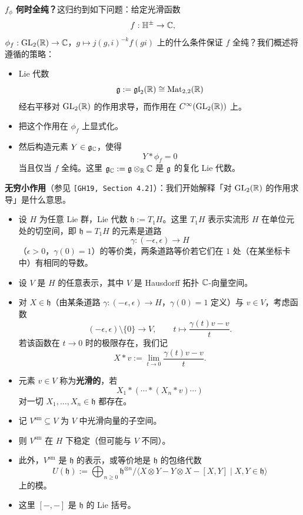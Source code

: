 \textbf{$f_\phi$ 何时全纯？}这归约到如下问题：给定光滑函数
\[
f:\mathbb{H}^\pm\to\mathbb{C},
\]
$\phi_f:\operatorname{GL}_2(\mathbb{R})\to\mathbb{C}$，$g\mapsto j(g,i)^{-k}f(gi)$ 上的什么条件保证 $f$ 全纯？我们概述将遵循的策略：
\begin{itemize}
\item Lie 代数
\[
\mathfrak{g}:=\mathfrak{gl}_2(\mathbb{R})\cong\mathrm{Mat}_{2,2}(\mathbb{R})
\]
经右平移对 $\operatorname{GL}_2(\mathbb{R})$ 的作用求导，而作用在 $C^\infty(\operatorname{GL}_2(\mathbb{R}))$ 上。
\item 把这个作用在 $\phi_f$ 上显式化。
\item 然后构造元素 $Y\in\mathfrak{g}_{\mathbb{C}}$，使得
\[
Y*\phi_f=0
\]
当且仅当 $f$ 全纯。这里 $\mathfrak{g}_{\mathbb{C}}:=\mathfrak{g}\otimes_{\mathbb{R}}\mathbb{C}$ 是 $\mathfrak{g}$ 的复化 Lie 代数。
\end{itemize}

\textbf{无穷小作用}（参见 \texttt{[GH19, Section 4.2]}）：我们开始解释「对 $\operatorname{GL}_2(\mathbb{R})$ 的作用求导」是什么意思。
\begin{itemize}
\item 设 $H$ 为任意 Lie 群，Lie 代数 $\mathfrak{h}:=T_1H$。这里 $T_1H$ 表示实流形 $H$ 在单位元处的切空间，即 $\mathfrak{h}=T_1H$ 的元素是道路
\[
\gamma:(-\epsilon,\epsilon)\to H
\]
（$\epsilon>0$，$\gamma(0)=1$）的等价类，两条道路等价若它们在 $1$ 处（在某坐标卡中）有相同的导数。
\item 设 $V$ 是 $H$ 的任意表示，其中 $V$ 是 Hausdorff 拓扑 $\mathbb{C}$-向量空间。
\item 对 $X\in\mathfrak{h}$（由某条道路 $\gamma:(-\epsilon,\epsilon)\to H$，$\gamma(0)=1$ 定义）与 $v\in V$，考虑函数
\[
(-\epsilon,\epsilon)\setminus\{0\}\to V,\qquad t\mapsto\frac{\gamma(t)v-v}{t}.
\]
若该函数在 $t\to0$ 时的极限存在，我们记
\[
X*v:=\lim_{t\to0}\frac{\gamma(t)v-v}{t}.
\]
\item 元素 $v\in V$ 称为\textbf{光滑的}，若
\[
X_1*(\cdots*(X_n*v)\cdots)
\]
对一切 $X_1,\dots,X_n\in\mathfrak{h}$ 都存在。
\item 记 $V^{\mathrm{sm}}\subseteq V$ 为 $V$ 中光滑向量的子空间。
\item 则 $V^{\mathrm{sm}}$ 在 $H$ 下稳定（但可能与 $V$ 不同）。
\item 此外，$V^{\mathrm{sm}}$ 是 $\mathfrak{h}$ 的表示，或等价地是 $\mathfrak{h}$ 的包络代数
\[
U(\mathfrak{h}):=\bigoplus_{n\ge0}\mathfrak{h}^{\otimes n}/\langle X\otimes Y-Y\otimes X-[X,Y]\mid X,Y\in\mathfrak{h}\rangle
\]
上的模。
\item 这里 $[-,-]$ 是 $\mathfrak{h}$ 的 Lie 括号。
\end{itemize}

